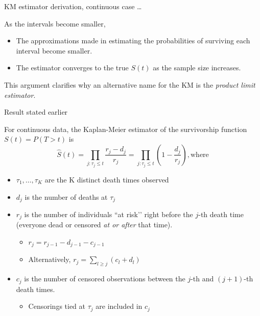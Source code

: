 \documentclass[ignorenonframetext,]{beamer}
\providecommand{\tightlist}{%
  \setlength{\itemsep}{0pt}\setlength{\parskip}{0pt}}
\begin{document}
\begin{frame}{%
\protect\hypertarget{km-estimator-derivation-continuous-case-3}{%
KM estimator derivation, continuous case \ldots}}

As the intervals become smaller,

\begin{itemize}
\tightlist
\item
  The approximations made in estimating the probabilities of surviving
  each interval become smaller.\\
\item
  The estimator converges to the true \(S(t)\) as the sample size
  increases.
\end{itemize}

This argument clarifies why an alternative name for the KM is the
\emph{product limit estimator}.

\end{frame}

\begin{frame}{%
\protect\hypertarget{result-stated-earlier}{%
Result stated earlier}}

For continuous data, the Kaplan-Meier estimator of the survivorship
function \(S(t)=P(T > t)\) is \[
\widehat{S}(t) = \prod_{j: \tau_j \leq t} \frac{ r_j - d_j } {r_j}
= \prod_{j: \tau_j \leq t} \left(1 - \frac{d_j}{r_j}\right), \text{where}
\]

\begin{itemize}
\tightlist
\item
  \(\tau_1, \ldots, \tau_K\) are the K distinct death times observed
\item
  \(d_j\) is the number of deaths at \(\tau_j\)
\item
  \(r_j\) is the number of individuals ``at risk’’ right before the
  \(j\)-th death time (everyone dead or censored \emph{at or after} that
  time).

  \begin{itemize}
  \tightlist
  \item
    \(r_j = r_{j-1} - d_{j-1} - c_{j-1}\)
  \item
    Alternatively, \(r_j = \sum_{l \ge j}(c_l+d_l)\)
  \end{itemize}
\item
  \(c_j\) is the number of censored observations between the \(j\)-th
  and \((j+1)\)-th death times.

  \begin{itemize}
  \tightlist
  \item
    Censorings tied at \(\tau_j\) are included in \(c_j\)
  \end{itemize}
\end{itemize}

\end{frame}
\end{document}
